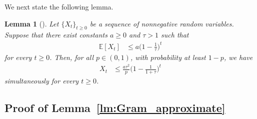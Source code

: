 \documentclass[11pt]{article}
\theoremstyle{plain}
\newtheorem{lemma}[theorem]{Lemma}
\theoremstyle{definition}
\theoremstyle{remark}
\theoremstyle{plain}
\begin{document}
We next state the following lemma.
\begin{lemma}[{\citet[Lemma~26]{lin2022explicit}}]
\label{lm:lin_lemma26}
Let $\{X_t\}_{t\geq0}$ be a sequence of nonnegative random variables.
Suppose that there exist constants $a\geq0$ and $\tau>1$ such that
\begin{align*}
\mathbb E[X_t]
&\leq a\biggl(1-\frac{1}{\tau}\biggr)^t
\end{align*}
for every $t\geq0$. Then, for all $p\in(0,1)$, with probability at
least $1-p$, we have
\begin{align*}
X_t
&\leq\frac{a\tau^2}{p}
\biggl(1-\frac{1}{1+\tau}\biggr)^t
\end{align*}
simultaneously for every $t\geq0$.
\end{lemma}

\subsection{Proof of Lemma~\ref{lm:Gram_approximate}}
\label{app:proof_lemma_gram_approximate}
\end{document}

